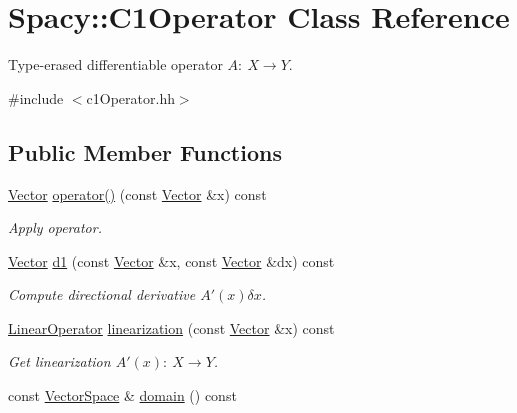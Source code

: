 \hypertarget{classSpacy_1_1C1Operator}{\section{Spacy\-:\-:C1\-Operator Class Reference}
\label{classSpacy_1_1C1Operator}
}


Type-\/erased differentiable operator $A:\ X \to Y $.  




{\ttfamily \#include $<$c1\-Operator.\-hh$>$}

\subsection*{Public Member Functions}
\begin{DoxyCompactItemize}
\item 
\hypertarget{classSpacy_1_1C1Operator_a2a01bf08bf2b6e44955cd606aa3db91d}{\hyperlink{classSpacy_1_1Vector}{Vector} \hyperlink{classSpacy_1_1C1Operator_a2a01bf08bf2b6e44955cd606aa3db91d}{operator()} (const \hyperlink{classSpacy_1_1Vector}{Vector} \&x) const }\label{classSpacy_1_1C1Operator_a2a01bf08bf2b6e44955cd606aa3db91d}

\begin{DoxyCompactList}\small\item\em Apply operator. \end{DoxyCompactList}\item 
\hypertarget{classSpacy_1_1C1Operator_a1b6a06c88bc4168c750ee4ffdc81f1dd}{\hyperlink{classSpacy_1_1Vector}{Vector} \hyperlink{classSpacy_1_1C1Operator_a1b6a06c88bc4168c750ee4ffdc81f1dd}{d1} (const \hyperlink{classSpacy_1_1Vector}{Vector} \&x, const \hyperlink{classSpacy_1_1Vector}{Vector} \&dx) const }\label{classSpacy_1_1C1Operator_a1b6a06c88bc4168c750ee4ffdc81f1dd}

\begin{DoxyCompactList}\small\item\em Compute directional derivative $A'(x)\delta x$. \end{DoxyCompactList}\item 
\hypertarget{classSpacy_1_1C1Operator_a71aabe09ec29a8a1bb197eef035d6672}{\hyperlink{classSpacy_1_1LinearOperator}{Linear\-Operator} \hyperlink{classSpacy_1_1C1Operator_a71aabe09ec29a8a1bb197eef035d6672}{linearization} (const \hyperlink{classSpacy_1_1Vector}{Vector} \&x) const }\label{classSpacy_1_1C1Operator_a71aabe09ec29a8a1bb197eef035d6672}

\begin{DoxyCompactList}\small\item\em Get linearization $A'(x):\ X\to Y $. \end{DoxyCompactList}\item 
\hypertarget{classSpacy_1_1C1Operator_aee0ffd5cee0b8a8df2f0b67b5aaf0ddb}{const \hyperlink{classSpacy_1_1VectorSpace}{Vector\-Space} \& \hyperlink{classSpacy_1_1C1Operator_aee0ffd5cee0b8a8df2f0b67b5aaf0ddb}{domain} () const }\label{classSpacy_1_1C1Operator_aee0ffd5cee0b8a8df2f0b67b5aaf0ddb}


\end{DoxyCompactItemize}
